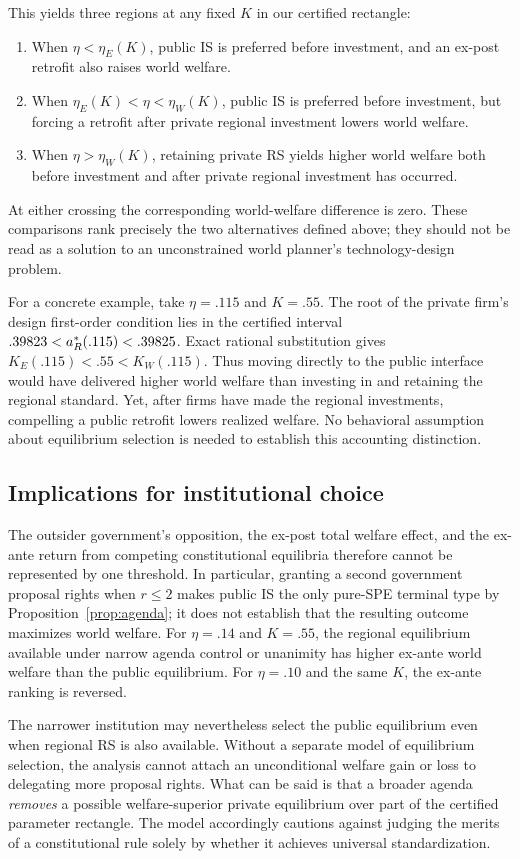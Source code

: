 This yields three regions at any fixed \(K\) in our certified rectangle:
\begin{enumerate}
\item When \(\eta<\eta_E(K)\), public IS is preferred before investment, and an ex-post retrofit also raises world welfare.
\item When \(\eta_E(K)<\eta<\eta_W(K)\), public IS is preferred before investment, but forcing a retrofit after private regional investment lowers world welfare.
\item When \(\eta>\eta_W(K)\), retaining private RS yields higher world welfare both before investment and after private regional investment has occurred.
\end{enumerate}
At either crossing the corresponding world-welfare difference is zero. These comparisons rank precisely the two alternatives defined above; they should not be read as a solution to an unconstrained world planner's technology-design problem.

For a concrete example, take \(\eta=.115\) and \(K=.55\).
The root of the private firm's design first-order condition
lies in the certified interval
\(.39823<a_R^*(.115)<.39825\).
Exact rational substitution gives
\(K_E(.115)<.55<K_W(.115)\).
Thus moving directly to the public interface would have
delivered higher world welfare than investing in and
retaining the regional standard. Yet, after firms have
made the regional investments, compelling a public
retrofit lowers realized welfare. No behavioral
assumption about equilibrium selection is needed
to establish this accounting distinction.

\subsection{Implications for institutional choice}\label{subsec:welfare-constitution}

The outsider government's opposition, the ex-post total welfare effect, and the ex-ante return from competing constitutional equilibria therefore cannot be represented by one threshold. In particular, granting a second government proposal rights when \(r\le2\) makes public IS the only pure-SPE terminal type by Proposition~\ref{prop:agenda}; it does not establish that the resulting outcome maximizes world welfare. For \(\eta=.14\) and \(K=.55\), the regional equilibrium available under narrow agenda control or unanimity has higher ex-ante world welfare than the public equilibrium. For \(\eta=.10\) and the same \(K\), the ex-ante ranking is reversed.

The narrower institution may nevertheless select the public equilibrium even when regional RS is also available. Without a separate model of equilibrium selection, the analysis cannot attach an unconditional welfare gain or loss to delegating more proposal rights. What can be said is that a broader agenda \emph{removes} a possible welfare-superior private equilibrium over part of the certified parameter rectangle. The model accordingly cautions against judging the merits of a constitutional rule solely by whether it achieves universal standardization.
